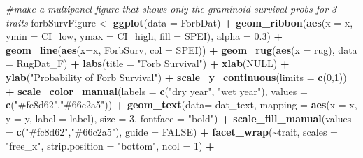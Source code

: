 \documentclass[
]{article}
\newenvironment{Shaded}{\begin{snugshade}}{\end{snugshade}}
\newcommand{\CommentTok}[1]{\textcolor[rgb]{0.56,0.35,0.01}{\textit{#1}}}
\newcommand{\DataTypeTok}[1]{\textcolor[rgb]{0.13,0.29,0.53}{#1}}
\newcommand{\DecValTok}[1]{\textcolor[rgb]{0.00,0.00,0.81}{#1}}
\newcommand{\FloatTok}[1]{\textcolor[rgb]{0.00,0.00,0.81}{#1}}
\newcommand{\KeywordTok}[1]{\textcolor[rgb]{0.13,0.29,0.53}{\textbf{#1}}}
\newcommand{\NormalTok}[1]{#1}
\newcommand{\OperatorTok}[1]{\textcolor[rgb]{0.81,0.36,0.00}{\textbf{#1}}}
\newcommand{\OtherTok}[1]{\textcolor[rgb]{0.56,0.35,0.01}{#1}}
\newcommand{\StringTok}[1]{\textcolor[rgb]{0.31,0.60,0.02}{#1}}
\begin{document}
\begin{Shaded}
\begin{Highlighting}[]
\CommentTok{\#make a multipanel figure that shows only the graminoid survival probs for 3 traits}
\NormalTok{forbSurvFigure \textless{}{-}}\StringTok{ }\KeywordTok{ggplot}\NormalTok{(}\DataTypeTok{data =}\NormalTok{ ForbDat) }\OperatorTok{+}
\StringTok{  }\KeywordTok{geom\_ribbon}\NormalTok{(}\KeywordTok{aes}\NormalTok{(}\DataTypeTok{x =}\NormalTok{ x, }\DataTypeTok{ymin =}\NormalTok{ CI\_low, }\DataTypeTok{ymax =}\NormalTok{ CI\_high, }\DataTypeTok{fill =}\NormalTok{ SPEI), }\DataTypeTok{alpha =} \FloatTok{0.3}\NormalTok{) }\OperatorTok{+}
\StringTok{  }\KeywordTok{geom\_line}\NormalTok{(}\KeywordTok{aes}\NormalTok{(}\DataTypeTok{x=}\NormalTok{x, ForbSurv, }\DataTypeTok{col =}\NormalTok{ SPEI))  }\OperatorTok{+}\StringTok{ }
\StringTok{  }\KeywordTok{geom\_rug}\NormalTok{(}\KeywordTok{aes}\NormalTok{(}\DataTypeTok{x =}\NormalTok{ rug), }\DataTypeTok{data =}\NormalTok{ RugDat\_F) }\OperatorTok{+}
\StringTok{  }\KeywordTok{labs}\NormalTok{(}\DataTypeTok{title =} \StringTok{"Forb Survival"}\NormalTok{) }\OperatorTok{+}
\StringTok{  }\KeywordTok{xlab}\NormalTok{(}\OtherTok{NULL}\NormalTok{) }\OperatorTok{+}
\StringTok{  }\KeywordTok{ylab}\NormalTok{(}\StringTok{"Probability of Forb Survival"}\NormalTok{) }\OperatorTok{+}
\StringTok{  }\KeywordTok{scale\_y\_continuous}\NormalTok{(}\DataTypeTok{limits =} \KeywordTok{c}\NormalTok{(}\DecValTok{0}\NormalTok{,}\DecValTok{1}\NormalTok{)) }\OperatorTok{+}
\StringTok{  }\KeywordTok{scale\_color\_manual}\NormalTok{(}\DataTypeTok{labels =} \KeywordTok{c}\NormalTok{(}\StringTok{"dry year"}\NormalTok{, }\StringTok{"wet year"}\NormalTok{), }\DataTypeTok{values =} \KeywordTok{c}\NormalTok{(}\StringTok{"\#fc8d62"}\NormalTok{,}\StringTok{"\#66c2a5"}\NormalTok{)) }\OperatorTok{+}
\StringTok{  }\KeywordTok{geom\_text}\NormalTok{(}\DataTypeTok{data=}\NormalTok{ dat\_text, }\DataTypeTok{mapping =} \KeywordTok{aes}\NormalTok{(}\DataTypeTok{x =}\NormalTok{ x, }\DataTypeTok{y =}\NormalTok{ y, }\DataTypeTok{label =}\NormalTok{ label), }\DataTypeTok{size =} \DecValTok{3}\NormalTok{, }\DataTypeTok{fontface =} \StringTok{"bold"}\NormalTok{) }\OperatorTok{+}
\StringTok{  }\KeywordTok{scale\_fill\_manual}\NormalTok{(}\DataTypeTok{values =} \KeywordTok{c}\NormalTok{(}\StringTok{"\#fc8d62"}\NormalTok{,}\StringTok{"\#66c2a5"}\NormalTok{), }\DataTypeTok{guide =} \OtherTok{FALSE}\NormalTok{) }\OperatorTok{+}
\StringTok{  }\KeywordTok{facet\_wrap}\NormalTok{(}\OperatorTok{\textasciitilde{}}\NormalTok{trait, }\DataTypeTok{scales =} \StringTok{"free\_x"}\NormalTok{, }\DataTypeTok{strip.position =}  \StringTok{"bottom"}\NormalTok{, }\DataTypeTok{ncol =} \DecValTok{1}\NormalTok{) }\OperatorTok{+}

\end{Highlighting}
\end{Shaded}
\end{document}
